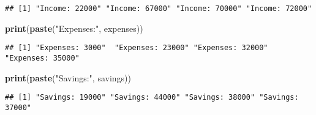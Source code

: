 \documentclass[
]{article}
\newenvironment{Shaded}{\begin{snugshade}}{\end{snugshade}}
\newcommand{\KeywordTok}[1]{\textcolor[rgb]{0.13,0.29,0.53}{\textbf{#1}}}
\newcommand{\NormalTok}[1]{#1}
\newcommand{\StringTok}[1]{\textcolor[rgb]{0.31,0.60,0.02}{#1}}
\begin{document}
\begin{verbatim}
## [1] "Income: 22000" "Income: 67000" "Income: 70000" "Income: 72000"
\end{verbatim}

\begin{Shaded}
\begin{Highlighting}[]
\KeywordTok{print}\NormalTok{(}\KeywordTok{paste}\NormalTok{(}\StringTok{"Expenses:"}\NormalTok{, expenses))}
\end{Highlighting}
\end{Shaded}

\begin{verbatim}
## [1] "Expenses: 3000"  "Expenses: 23000" "Expenses: 32000" "Expenses: 35000"
\end{verbatim}

\begin{Shaded}
\begin{Highlighting}[]
\KeywordTok{print}\NormalTok{(}\KeywordTok{paste}\NormalTok{(}\StringTok{"Savings:"}\NormalTok{, savings))}
\end{Highlighting}
\end{Shaded}

\begin{verbatim}
## [1] "Savings: 19000" "Savings: 44000" "Savings: 38000" "Savings: 37000"
\end{verbatim}
\end{document}
